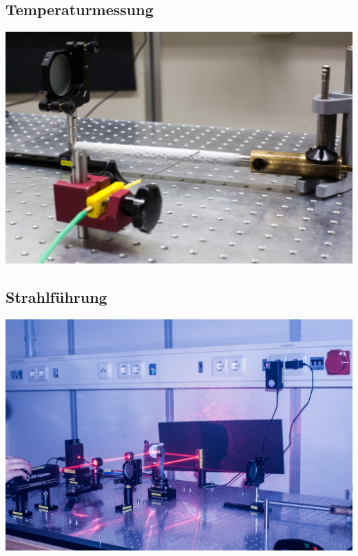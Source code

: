\subsection*{Temperaturmessung}
\begin{frame}
	\includegraphics[width=\textwidth]{images/2/interferrometer-2}
\end{frame}
\subsection*{Strahlführung}
\begin{frame}
	\includegraphics[width=\textwidth]{images/2/interferrometer-6}
\end{frame}